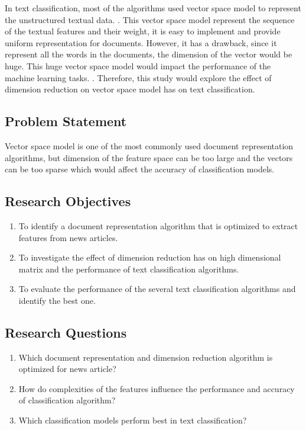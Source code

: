 In text classification, most of the algorithms used vector space model to represent the unstructured textual data. \cite{vectorSpaceModelText}. This vector space model represent the sequence of the textual features and their weight, it is easy to implement and provide uniform representation for documents. However, it has a drawback, since it represent all the words in the documents, the dimension of the vector would be huge. This huge vector space model would impact the performance of the machine learning tasks. \cite{knnVectorSpaceReduction}. Therefore, this study would explore the effect of dimension reduction on vector space model has on text classification.\\

\subsection{Problem Statement}
Vector space model is one of the most commonly used document representation algorithms, but dimension of the feature space can be too large and the vectors can be too sparse which would affect the accuracy of classification models.\\

\subsection{Research Objectives}
\begin{enumerate}
	\item To identify a document representation algorithm that is optimized to extract features from news articles.
	\item To investigate the effect of dimension reduction has on high dimensional matrix and the performance of text classification algorithms.
	\item To evaluate the performance of the several text classification algorithms and identify the best one.
\end{enumerate}


\subsection{Research Questions}
\begin{enumerate}
	\item Which document representation and dimension reduction algorithm is optimized for news article?
	\item How do complexities of the features influence the performance and accuracy of classification algorithm?
	\item Which classification models perform best in text classification?
\end{enumerate}

